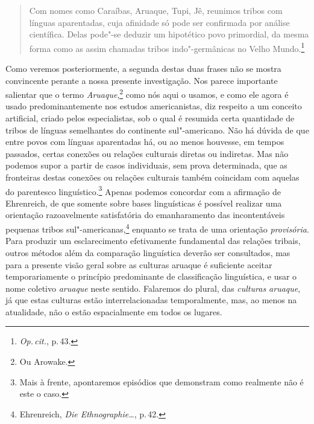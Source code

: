 \begin{quote}
Com nomes como Caraíbas, Aruaque, Tupi, Jê, reunimos tribos com línguas aparentadas, cuja afinidade só pode ser confirmada por análise científica. Delas pode"-se deduzir um hipotético povo primordial, da mesma forma como as assim chamadas tribos indo"-germânicas no Velho Mundo.\footnote{\textit{Op.\,cit.}, p.\,43.} 
\end{quote}

Como veremos posteriormente, a segunda destas duas frases não se
mostra convincente perante a nossa presente investigação. Nos parece
importante salientar que o termo \textit{Aruaque},\footnote{Ou Arowake.} como nós aqui o usamos, 
e como ele agora é usado predominantemente nos
estudos americanistas, diz respeito a um conceito artificial, criado
pelos especialistas, sob o qual é resumida certa quantidade de tribos
de línguas semelhantes do continente sul"-americano. Não há dúvida de que
entre povos com línguas aparentadas há, ou ao menos houvesse, em tempos
passados, certas conexões ou relações culturais diretas ou indiretas.
Mas não podemos supor a partir de casos individuais, sem prova
determinada, que as fronteiras destas conexões ou relações culturais
também coincidam com aquelas do parentesco linguístico.\footnote{Mais à frente, apontaremos episódios
que demonstram como realmente não é este o caso.} Apenas podemos
concordar com a afirmação de Ehrenreich, de que somente sobre bases
linguísticas é possível realizar uma orientação razoavelmente
satisfatória do emanharamento das incontentáveis pequenas tribos
sul"-americanas,\footnote{Ehrenreich, \textit{Die Ethnographie\ldots}, p.\,42.} enquanto se trata de uma
orientação \textit{provisória}. Para produzir um esclarecimento
efetivamente fundamental das relações tribais, outros métodos além da
comparação linguística deverão ser consultados, mas para a presente
visão geral sobre as culturas aruaque é suficiente aceitar
temporariamente o princípio predominante de classificação linguística, 
e usar o nome coletivo \textit{aruaque} neste
sentido. Falaremos do plural, das \textit{culturas aruaque}, já que estas
culturas estão interrelacionadas temporalmente, mas, ao menos na
atualidade, não o estão espacialmente em todos os lugares.

